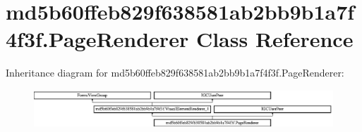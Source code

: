 \hypertarget{classmd5b60ffeb829f638581ab2bb9b1a7f4f3f_1_1PageRenderer}{}\section{md5b60ffeb829f638581ab2bb9b1a7f4f3f.\+Page\+Renderer Class Reference}
\label{classmd5b60ffeb829f638581ab2bb9b1a7f4f3f_1_1PageRenderer}
Inheritance diagram for md5b60ffeb829f638581ab2bb9b1a7f4f3f.\+Page\+Renderer\+:\begin{figure}[H]
\begin{center}
\leavevmode
\includegraphics[height=1.403509cm]{classmd5b60ffeb829f638581ab2bb9b1a7f4f3f_1_1PageRenderer}
\end{center}
\end{figure}
